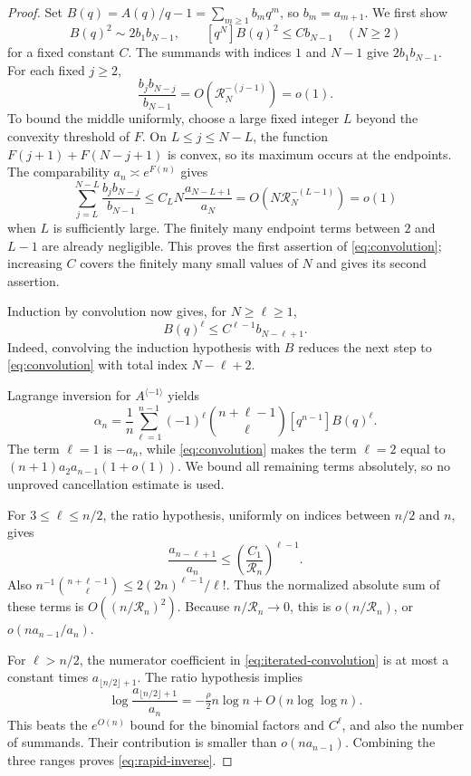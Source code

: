 \documentclass[11pt,a4paper]{article}
\numberwithin{equation}{section}
\theoremstyle{definition}
\theoremstyle{remark}
\begin{document}
\begin{proof}
Set $B(q)=A(q)/q-1=\sum_{m\ge1}b_mq^m$, so $b_m=a_{m+1}$.
We first show
\begin{equation}
 [q^N]B(q)^2\sim2b_1b_{N-1},\qquad
 [q^N]B(q)^2\le Cb_{N-1}\quad(N\ge2)
 \label{eq:convolution}
\end{equation}
for a fixed constant $C$.
The summands with indices $1$ and $N-1$ give $2b_1b_{N-1}$.
For each fixed $j\ge2$,
\[
 \frac{b_jb_{N-j}}{b_{N-1}}=O(\mathcal R_N^{-(j-1)})=o(1).
\]
To bound the middle uniformly, choose a large fixed integer $L$ beyond
the convexity threshold of $F$. On $L\le j\le N-L$, the function
$F(j+1)+F(N-j+1)$ is convex, so its maximum occurs at the endpoints.
The comparability $a_n\asymp e^{F(n)}$ gives
\[
 \sum_{j=L}^{N-L}\frac{b_jb_{N-j}}{b_{N-1}}
 \le C_L N\frac{a_{N-L+1}}{a_N}
 =O(N\mathcal R_N^{-(L-1)})=o(1)
\]
when $L$ is sufficiently large. The finitely many endpoint terms between
$2$ and $L-1$ are already negligible. This proves the first assertion
of \eqref{eq:convolution}; increasing $C$ covers the finitely many small
values of $N$ and gives its second assertion.

Induction by convolution now gives, for $N\ge\ell\ge1$,
\begin{equation}
 [q^N]B(q)^\ell\le C^{\ell-1}b_{N-\ell+1}.
 \label{eq:iterated-convolution}
\end{equation}
Indeed, convolving the induction hypothesis with $B$ reduces the next
step to \eqref{eq:convolution} with total index $N-\ell+2$.

Lagrange inversion for $A^{\langle-1\rangle}$ yields
\begin{equation}
 \alpha_n=\frac1n\sum_{\ell=1}^{n-1}(-1)^\ell
 \binom{n+\ell-1}{\ell}[q^{n-1}]B(q)^\ell.
 \label{eq:inverse-binomial}
\end{equation}
The term $\ell=1$ is $-a_n$, while \eqref{eq:convolution} makes the term
$\ell=2$ equal to $(n+1)a_2a_{n-1}(1+o(1))$.
We bound all remaining terms absolutely, so no unproved cancellation
estimate is used.

For $3\le\ell\le n/2$, the ratio hypothesis, uniformly on indices
between $n/2$ and $n$, gives
\[
 \frac{a_{n-\ell+1}}{a_n}\le
 \left(\frac{C_1}{\mathcal R_n}\right)^{\ell-1}.
\]
Also $n^{-1}\binom{n+\ell-1}{\ell}\le
2(2n)^{\ell-1}/\ell!$. Thus the normalized absolute sum of these terms
is $O((n/\mathcal R_n)^2)$. Because $n/\mathcal R_n\to0$, this is
$o(n/\mathcal R_n)$, or $o(na_{n-1}/a_n)$.

For $\ell>n/2$, the numerator coefficient in
\eqref{eq:iterated-convolution} is at most a constant times
$a_{\lfloor n/2\rfloor+1}$. The ratio hypothesis implies
\[
 \log\frac{a_{\lfloor n/2\rfloor+1}}{a_n}
 =-\tfrac\rho2 n\log n+O(n\log\log n).
\]
This beats the $e^{O(n)}$ bound for the binomial factors and $C^\ell$,
and also the number of summands. Their contribution is smaller than
$o(na_{n-1})$. Combining the three ranges proves
\eqref{eq:rapid-inverse}.
\end{proof}
\end{document}
